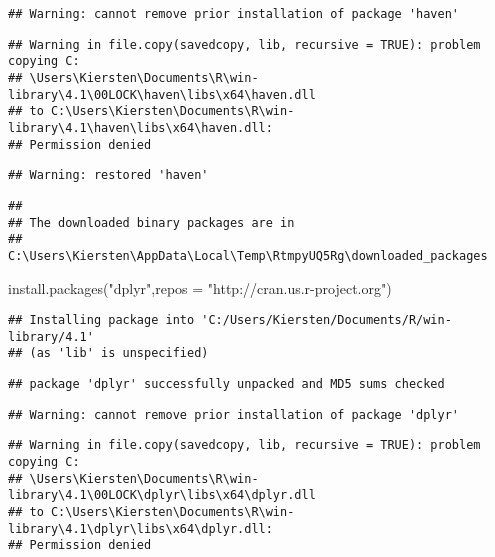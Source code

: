 \documentclass[
]{article}
\newenvironment{Shaded}{\begin{snugshade}}{\end{snugshade}}
\newcommand{\AttributeTok}[1]{\textcolor[rgb]{0.77,0.63,0.00}{#1}}
\newcommand{\FunctionTok}[1]{\textcolor[rgb]{0.00,0.00,0.00}{#1}}
\newcommand{\NormalTok}[1]{#1}
\newcommand{\StringTok}[1]{\textcolor[rgb]{0.31,0.60,0.02}{#1}}
\begin{document}
\begin{verbatim}
## Warning: cannot remove prior installation of package 'haven'
\end{verbatim}

\begin{verbatim}
## Warning in file.copy(savedcopy, lib, recursive = TRUE): problem copying C:
## \Users\Kiersten\Documents\R\win-library\4.1\00LOCK\haven\libs\x64\haven.dll
## to C:\Users\Kiersten\Documents\R\win-library\4.1\haven\libs\x64\haven.dll:
## Permission denied
\end{verbatim}

\begin{verbatim}
## Warning: restored 'haven'
\end{verbatim}

\begin{verbatim}
## 
## The downloaded binary packages are in
##  C:\Users\Kiersten\AppData\Local\Temp\RtmpyUQ5Rg\downloaded_packages
\end{verbatim}

\begin{Shaded}
\begin{Highlighting}[]
\FunctionTok{install.packages}\NormalTok{(}\StringTok{"dplyr"}\NormalTok{,}\AttributeTok{repos =} \StringTok{"http://cran.us.r{-}project.org"}\NormalTok{)}
\end{Highlighting}
\end{Shaded}

\begin{verbatim}
## Installing package into 'C:/Users/Kiersten/Documents/R/win-library/4.1'
## (as 'lib' is unspecified)
\end{verbatim}

\begin{verbatim}
## package 'dplyr' successfully unpacked and MD5 sums checked
\end{verbatim}

\begin{verbatim}
## Warning: cannot remove prior installation of package 'dplyr'
\end{verbatim}

\begin{verbatim}
## Warning in file.copy(savedcopy, lib, recursive = TRUE): problem copying C:
## \Users\Kiersten\Documents\R\win-library\4.1\00LOCK\dplyr\libs\x64\dplyr.dll
## to C:\Users\Kiersten\Documents\R\win-library\4.1\dplyr\libs\x64\dplyr.dll:
## Permission denied
\end{verbatim}
\end{document}
